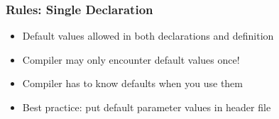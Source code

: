 \begin{frame}
  \frametitle{Rules: Single Declaration}
  \begin{itemize}
    \item Default values allowed in both declarations and definition
    \item Compiler may only encounter default values once!
    \item Compiler has to know defaults when you use them
    \item Best practice: put default parameter values in header file
  \end{itemize}
  \vskip5mm
  \begin{overprint}
  \end{overprint}
\end{frame}






